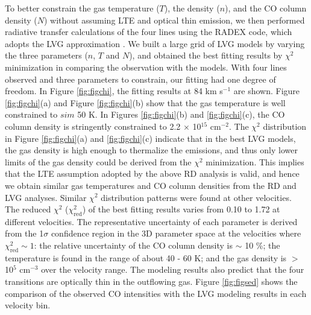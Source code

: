 To better constrain the gas temperature ($T$), the density ($n$), and the CO column density ($N$) without assuming LTE and optical thin emission, we then performed radiative transfer calculations of the four lines using the RADEX code, which adopts the LVG approximation \citep{2007A&A...468..627V}. We built a large grid of LVG models by varying the three parameters ($n$, $T$ and $N$), and obtained the best fitting results by $\chi^2$ minimization in comparing the observation with the models. With four lines observed and three parameters to constrain, our fitting had one degree of freedom. In Figure \ref{fig:figchi}, the fitting results at 84 km s$^{-1}$ are shown. Figure \ref{fig:figchi}(a) and Figure \ref{fig:figchi}(b) show that the gas temperature is well constrained to $sim$ 50 K. In Figures \ref{fig:figchi}(b) and \ref{fig:figchi}(c), the CO column density is stringently constrained to 2.2 $\times$ 10$^{15}$ cm$^{-2}$. The $\chi^2$ distribution in Figure \ref{fig:figchi}(a) and \ref{fig:figchi}(c) indicate that in the best LVG models, the gas density is high enough to thermalize the emissions, and thus only lower limits of the gas density could be derived from the $\chi^2$ minimization. This implies that the LTE assumption adopted by the above RD analysis is valid, and hence we obtain similar gas temperatures and CO column densities from the RD and LVG analyses. Similar $\chi^2$ distribution patterns were found at other velocities. The reduced $\chi^2$ ($\chi^2_{\mathrm{red}}$) of the best fitting results varies from 0.10 to 1.72 at different velocities. The representative uncertainty of each parameter is derived from the 1$\sigma$ confidence region in the 3D parameter space at the velocities where $\chi^2_{\mathrm{red}} \sim 1$: the relative uncertainty of the CO column density is $\sim$ 10 \%; the temperature is found in the range of about 40 - 60 K; and the gas density is $>$ 10$^5$ cm$^{-3}$ over the velocity range. The modeling results also predict that the four transitions are optically thin in the outflowing gas. Figure \ref{fig:figsed} shows the comparison of the observed CO intensities with the LVG modeling results in each velocity bin. 


